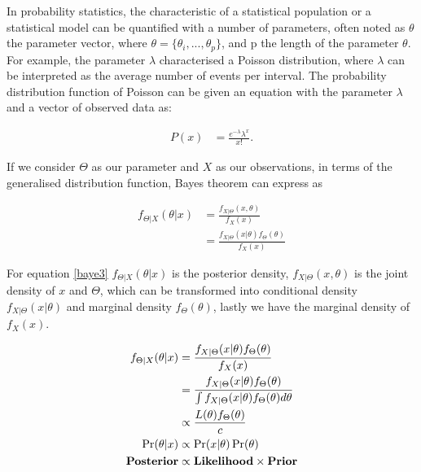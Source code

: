 \newpara

In probability statistics, the characteristic of a statistical population or a statistical model can be quantified with a number of parameters, often noted as $\theta$ the parameter vector, where $\theta = \{\theta_i ,...,\theta_p\}$, and p  the length of the parameter $\theta$. For example, the parameter $\lambda$ characterised a Poisson distribution, where $\lambda$ can be interpreted as the average number of events per interval. The probability distribution function of Poisson can be given an equation with the parameter $\lambda$ and a vector of observed data as:

\begin{equation} \label{baye2}
\begin{aligned}
P\left( x \right) &= \frac{{e^{ - \lambda } \lambda ^x }}{{x!}}.
\end{aligned}
\end{equation}

If we consider $\Theta$ as our parameter and $X$ as our observations, in terms of the generalised distribution function, Bayes theorem can express as

\begin{equation} \label{baye3}
\begin{aligned}
f_{\Theta|X}(\theta|x) 
&= \frac{f_{X|\Theta}(x,\theta)}{f_X(x)} \\
&= \frac{f_{X|\Theta}(x|\theta) f_\Theta(\theta)}{f_X(x)} 
\end{aligned}
\end{equation}

For equation \ref{baye3} $f_{\Theta|X}(\theta|x)$ is the posterior density, $f_{X|\Theta}(x,\theta)$ is the joint density of $x$ and $\Theta$, which can be transformed into conditional density $f_{X|\Theta}(x|\theta)$ and marginal density $f_\Theta(\theta)$, lastly we have the marginal density of $f_X(x)$.


\begin{equation} \label{baye4}
\begin{aligned}
f_{\Theta|X}(\theta|x) 
&= \frac{f_{X|\Theta}(x|\theta) f_\Theta(\theta)}{f_X(x)} \\
&= \frac{f_{X|\Theta}(x|\theta) f_\Theta(\theta)}{\int f_{X|\Theta}(x|\theta) f_\Theta(\theta) d\theta } \\
&\propto \frac{L(\theta) f_\Theta(\theta)}{c}\\
\Pr(\theta|x) 
&\propto \Pr(x|\theta)\Pr(\theta)\\
\textbf{\text{Posterior}} 
&\propto \textbf{\text{Likelihood}} \times \textbf{\text{Prior}}
\end{aligned}
\end{equation}

